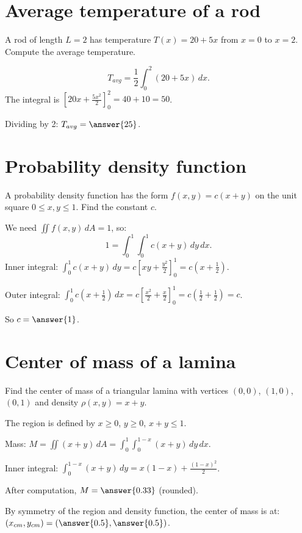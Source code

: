 \documentclass{ximera}
\begin{document}
\section{Average temperature of a rod}

\begin{problem}
A rod of length $L=2$ has temperature $T(x)=20+5x$ from $x=0$ to $x=2$. 
Compute the average temperature.

\begin{solution}
\[
T_{avg} = \frac{1}{2}\int_0^2 (20+5x)\,dx.
\]
The integral is $\left[20x+\frac{5x^2}{2}\right]_0^2=40+10=50$. 

Dividing by 2: $T_{avg} = \answer{25}$.
\end{solution}
\end{problem}

\section{Probability density function}

\begin{problem}
A probability density function has the form $f(x,y)=c(x+y)$ on the unit square $0\leq x,y\leq 1$. Find the constant $c$.

\begin{solution}
We need $\iint f(x,y)\,dA = 1$, so:
\[
1=\int_0^1\int_0^1 c(x+y)\,dy\,dx.
\]
Inner integral: $\int_0^1 c(x+y)\,dy = c\left[xy + \frac{y^2}{2}\right]_0^1=c\left(x+\frac{1}{2}\right)$.

Outer integral: $\int_0^1 c\left(x+\frac{1}{2}\right)\,dx = c\left[\frac{x^2}{2}+\frac{x}{2}\right]_0^1 = c\left(\frac{1}{2}+\frac{1}{2}\right)=c$.

So $c=\answer{1}$.
\end{solution}
\end{problem}

\section{Center of mass of a lamina}

\begin{problem}
Find the center of mass of a triangular lamina with vertices $(0,0)$, $(1,0)$, $(0,1)$ and density $\rho(x,y)=x+y$.

\begin{solution}
The region is defined by $x\ge0$, $y\ge0$, $x+y\le1$.

Mass: $M=\iint (x+y)\,dA = \int_0^1\int_0^{1-x}(x+y)\,dy\,dx$.

Inner integral: $\int_0^{1-x}(x+y)\,dy = x(1-x)+\frac{(1-x)^2}{2}$.

After computation, $M=\answer{0.33}$ (rounded).

By symmetry of the region and density function, the center of mass is at:
$(x_{cm},y_{cm})=\left(\answer{0.5},\answer{0.5}\right)$.
\end{solution}
\end{problem}
\end{document}
